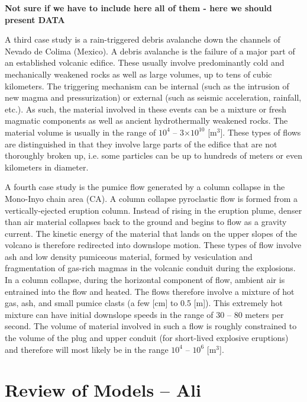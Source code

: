 \documentclass{article}
\begin{document}
\textbf{Not sure if we have to include here all of them - here we should present DATA}

A third case study is a rain-triggered debris avalanche down the channels of Nevado de Colima (Mexico).
A debris avalanche is the failure of a major part of an established volcanic edifice. These usually involve predominantly cold and mechanically weakened rocks as well as large volumes, up to tens of cubic kilometers. The triggering mechanism can be internal (such as the intrusion of new magma and pressurization) or external (such as seismic acceleration, rainfall, etc.). As such, the material involved in these events can be a mixture or fresh magmatic components as well as ancient hydrothermally weakened rocks. The material volume is usually in the range of $10^4$ -- 3$\times10^{10}$ [$\mathrm{m^3}$]. These types of flows are distinguished in that they involve large parts of the edifice that are not thoroughly broken up, i.e. some particles can be up to hundreds of meters or even kilometers in diameter.

A fourth case study is the pumice flow generated by a column collapse in the Mono-Inyo chain area (CA).
A column collapse pyroclastic flow is formed from a vertically-ejected eruption column. Instead of rising in the eruption plume, denser than air material collapses back to the ground and begins to flow as a gravity current. The kinetic energy of the material that lands on the upper slopes of the volcano is therefore redirected into downslope motion. These types of flow involve ash and low density pumiceous material, formed by vesiculation and fragmentation of gas-rich magmas in the volcanic conduit during the explosions. In a column collapse, during the horizontal component of flow, ambient air is entrained into the flow and heated. The flows therefore involve a mixture of hot gas, ash, and small pumice clasts (a few [cm] to 0.5 [m]). This extremely hot mixture can have initial downslope speeds in the range of 30 -- 80 meters per second. The volume of material involved in such a flow is roughly constrained to the volume of the plug and upper conduit (for short-lived explosive eruptions) and therefore will most likely be in the range $10^4$ -- $10^6$ [$\mathrm{m^3}$].

\section{Review of Models -- Ali}\label{sec:GeoPhFlows}
\end{document}
